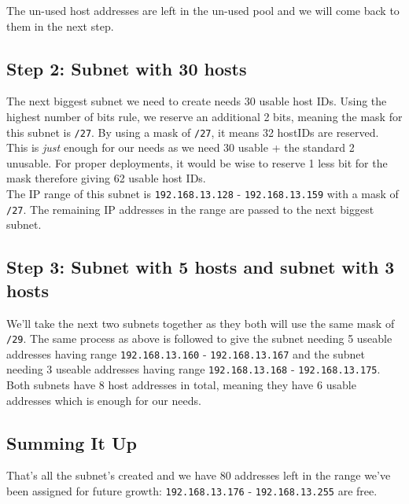 The un-used host addresses are left in the un-used pool and we will come back to them in the next step.

\subsection{Step 2: Subnet with 30 hosts}
The next biggest subnet we need to create needs 30 usable host IDs. Using the highest number of bits rule, we reserve an additional 2 bits, meaning the mask for this subnet is \verb|/27|. By using a mask of \verb|/27|, it means 32 hostIDs are reserved. This is \textit{just} enough for our needs as we need 30 usable + the standard 2 unusable. For proper deployments, it would be wise to reserve 1 less bit for the mask therefore giving 62 usable host IDs.\\

The IP range of this subnet is \verb|192.168.13.128| - \verb|192.168.13.159| with a mask of \verb|/27|. The remaining IP addresses in the range are passed to the next biggest subnet.

\subsection{Step 3: Subnet with 5 hosts and subnet with 3 hosts}
We'll take the next two subnets together as they both will use the same mask of \verb|/29|. The same process as above is followed to give the subnet needing 5 useable addresses having range \verb|192.168.13.160| - \verb|192.168.13.167| and the subnet needing 3 useable addresses having range \verb|192.168.13.168| - \verb|192.168.13.175|. Both subnets have 8 host addresses in total, meaning they have 6 usable addresses which is enough for our needs.

\subsection{Summing It Up}
That's all the subnet's created and we have 80 addresses left in the range we've been assigned for future growth: \verb|192.168.13.176| - \verb|192.168.13.255| are free. 

